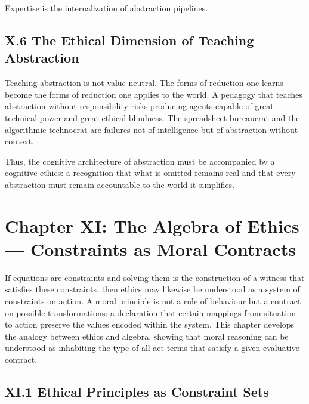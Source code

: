 \documentclass[11pt,letterpaper]{article}
\begin{document}
Expertise is the internalization of abstraction pipelines.

\subsection{X.6 The Ethical Dimension of Teaching Abstraction}

Teaching abstraction is not value-neutral. The forms of reduction one learns become the forms of reduction one applies to the world. A pedagogy that teaches abstraction without responsibility risks producing agents capable of great technical power and great ethical blindness. The spreadsheet-bureaucrat and the algorithmic technocrat are failures not of intelligence but of abstraction without context.

Thus, the cognitive architecture of abstraction must be accompanied by a cognitive ethics: a recognition that what is omitted remains real and that every abstraction must remain accountable to the world it simplifies.

\newpage
\section{Chapter XI: The Algebra of Ethics — Constraints as Moral Contracts}

If equations are constraints and solving them is the construction of a witness that satisfies these constraints, then ethics may likewise be understood as a system of constraints on action. A moral principle is not a rule of behaviour but a contract on possible transformations: a declaration that certain mappings from situation to action preserve the values encoded within the system. This chapter develops the analogy between ethics and algebra, showing that moral reasoning can be understood as inhabiting the type of all act-terms that satisfy a given evaluative contract.

\subsection{XI.1 Ethical Principles as Constraint Sets}
\end{document}
